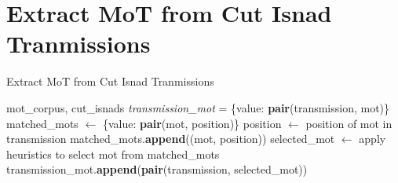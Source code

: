 \documentclass[12pt,english]{article}
\newcommand{\myindent}[1]{
\newline\makebox[#1cm]{}
}
\begin{document}
\newpage
\section{Extract MoT from Cut Isnad Tranmissions} %
\begin{center}
\begin{minipage}{.8\linewidth}
\begin{algorithm}[H]
\caption{Extract MoT from Cut Isnad Tranmissions}\label{euclid}
\begin{algorithmic}[1]
\Require mot\_corpus, cut\_isnads
\State \textit{transmission\_mot} = \{value: \textbf{pair}(transmission, mot)\}
    \State matched\_mots $\gets$ \{value: \textbf{pair}(mot, position)\}
            \State position $\gets$ position of mot in transmission
            \State matched\_mots.\textbf{append}((mot, position))
        \EndIf 
    \EndForeach
    \State selected\_mot $\gets$ apply heuristics to select mot from \myindent{3.35} matched\_mots
    \State transmission\_mot.\textbf{append}(\textbf{pair}(transmission, \myindent{6.25} selected\_mot))
\EndForeach

\end{algorithmic}
\end{algorithm}
\end{minipage}
\end{center}

\newpage
\end{document}
